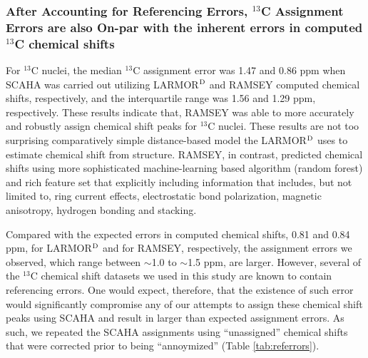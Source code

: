 \documentclass[journal=jcisd8,manuscript=article,layout=onecolumn]{achemso}
\begin{document}
\subsubsection{After Accounting for Referencing Errors, $^{13}$C Assignment Errors are also On-par with the inherent errors in computed $^{13}$C chemical shifts} For $^{13}$C nuclei, the median $^{13}$C assignment error was 1.47 and 0.86 ppm when SCAHA was carried out utilizing LARMOR$^{\rm D}$ and RAMSEY computed chemical shifts, respectively, and the interquartile range was 1.56 and 1.29 ppm, respectively. These results indicate that, RAMSEY was able to more accurately and robustly assign chemical shift peaks for  $^{13}$C nuclei. These results are not too surprising comparatively simple distance-based model the LARMOR$^{\rm D}$ uses to estimate chemical shift from structure. RAMSEY, in contrast, predicted chemical shifts using more sophisticated machine-learning based algorithm (random forest) and rich feature set that explicitly including information that includes, but not limited to, ring current effects, electrostatic bond polarization, magnetic anisotropy, hydrogen bonding and stacking. 

Compared with the expected errors in computed chemical shifts,   0.81 and 0.84 ppm, for LARMOR$^{\rm D}$ and for RAMSEY,  respectively, the assignment errors we observed, which range between $\sim$1.0 to $\sim$1.5 ppm, are larger. However, several of the $^{13}$C chemical shift datasets we used in this study are known to contain referencing errors. One would expect, therefore, that the existence of such error would significantly compromise  any of our attempts to assign these chemical shift peaks using SCAHA and result in larger than expected assignment errors.  As such, we repeated the SCAHA assignments using ``unassigned'' chemical shifts that were corrected prior to being ``annoymized'' (Table \ref{tab:referrors}).  
\end{document}
